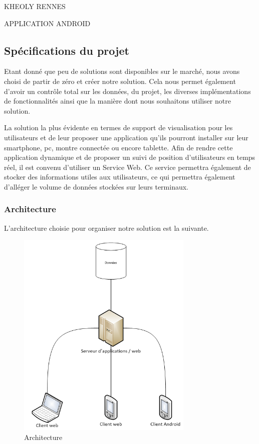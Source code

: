 KHEOLY RENNES

APPLICATION ANDROID

\subsection{Spécifications du projet}

Etant donné que peu de solutions sont disponibles sur le marché, nous avons choisi de partir de zéro et créer notre solution. Cela nous permet également d'avoir un contrôle total sur les données, du projet, les diverses implémentations de fonctionnalités ainsi que la manière dont nous souhaitons utiliser notre solution.

La solution la plus évidente en termes de support de visualisation pour les utilisateurs et de leur proposer une application qu'ils pourront installer sur leur smartphone, pc, montre connectée ou encore tablette.
Afin de rendre cette application dynamique et de proposer un suivi de position d'utilisateurs en temps réel, il est convenu d'utiliser un Service Web. Ce service permettra également de stocker des informations utiles aux utilisateurs, ce qui permettra également d'alléger le volume de données stockées sur leurs terminaux.

\subsubsection{Architecture}

L'architecture choisie pour organiser notre solution est la suivante.

\begin{figure}[H]
    \centering
    \includegraphics[height=10cm]{../infrastructure.png}
    \caption{Architecture}
    \label{architecture}
\end{figure}

